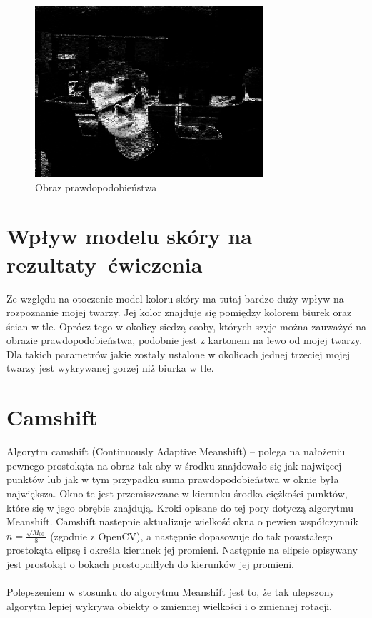 \documentclass[a4paper, 12pt, titlepage]{article}
\begin{document}
        \begin{figure}[H]
            \centering
            \includegraphics[width=0.8\linewidth]{maj_fejs.png}
            \caption{Obraz prawdopodobieństwa}
        \end{figure}
    \section{Wpływ modelu skóry na rezultaty ćwiczenia}
        Ze względu na otoczenie model koloru skóry ma tutaj bardzo
        duży wpływ na rozpoznanie mojej twarzy. Jej kolor znajduje
        się pomiędzy kolorem biurek oraz ścian w tle. Oprócz tego w
        okolicy siedzą osoby, których szyje można zauważyć na obrazie
        prawdopodobieństwa, podobnie jest z kartonem na lewo od 
        mojej twarzy. Dla takich parametrów jakie zostały ustalone 
        w okolicach jednej trzeciej mojej twarzy jest wykrywanej gorzej
        niż biurka w tle.
    \section{Camshift}
        Algorytm camshift (Continuously Adaptive Meanshift) -- polega na
        nałożeniu pewnego prostokąta na obraz tak aby w środku
        znajdowało się jak najwięcej punktów lub jak w tym przypadku
        suma prawdopodobieństwa w oknie była największa. Okno te jest
        przemiszczane w kierunku środka ciężkości punktów, które się w
        jego obrębie znajdują. Kroki opisane do tej pory dotyczą 
        algorytmu Meanshift. Camshift nastepnie aktualizuje wielkość
        okna o pewien współczynnik $n = \frac{\sqrt{M_{00}}}{8}$
        (zgodnie z OpenCV), a następnie dopasowuje do tak powstałego 
        prostokąta elipsę i określa kierunek jej promieni. Następnie 
        na elipsie opisywany jest prostokąt o bokach prostopadłych do
        kierunków jej promieni.
        \\ \\
        Polepszeniem w stosunku do algorytmu Meanshift jest to, że tak
        ulepszony algorytm lepiej wykrywa obiekty o zmiennej wielkości 
        i o zmiennej rotacji.
\end{document}
